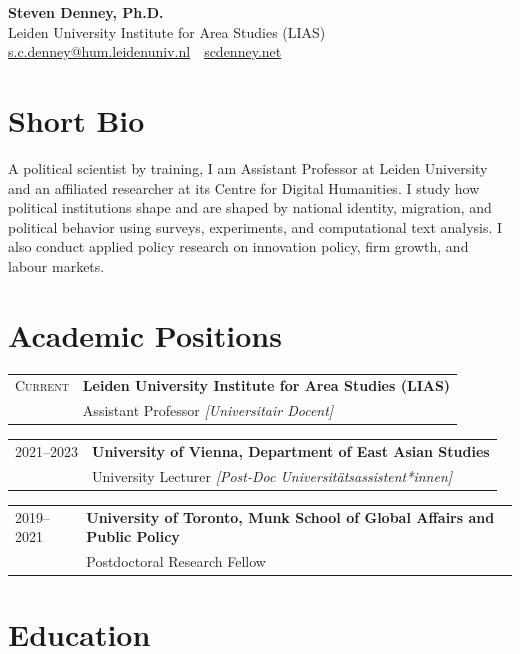 \documentclass[11pt, a4paper]{article}
\makeatletter
\newcommand{\cventry}[3]{%
  \noindent
  \begin{tabularx}{\textwidth}{@{}p{2.4cm}X@{}}
    \textsc{#1} & \textbf{#2} \\
                 & #3
  \end{tabularx}\vspace{0.05em}%
}
\makeatother
\begin{document}
\begin{center}
  {\LARGE\sffamily\bfseries Steven Denney, Ph.D.}\\[0.3em]
  {\normalsize
    Leiden University Institute for Area Studies (LIAS)\\[0.1em]
    \href{mailto:s.c.denney@hum.leidenuniv.nl}{s.c.denney@hum.leidenuniv.nl}
    \,\textperiodcentered\,
    \href{https://scdenney.net}{scdenney.net}
  }
\end{center}

\vspace{0.15em}


\section{Short Bio}

A political scientist by training, I am Assistant Professor at Leiden University and an affiliated researcher at its Centre for Digital Humanities. I study how political institutions shape and are shaped by national identity, migration, and political behavior using surveys, experiments, and computational text analysis. I also conduct applied policy research on innovation policy, firm growth, and labour markets.

\section{Academic Positions}

\cventry{Current}{Leiden University Institute for Area Studies (LIAS)}
  {Assistant Professor \textit{[Universitair Docent]}}

\cventry{2021--2023}{University of Vienna, Department of East Asian Studies}
  {University Lecturer \textit{[Post-Doc Universitätsassistent*innen]}}

\cventry{2019--2021}{University of Toronto, Munk School of Global Affairs and Public Policy}
  {Postdoctoral Research Fellow}

\section{Education}
\end{document}

